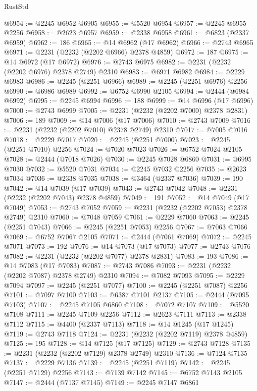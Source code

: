 \begin{lexlean}{RustStd}
\begin{coremodule}
@6954 := @2245 @6952 @6905
@6955 := @5520 @6954
@6957 := @2245 @6955 @2256
@6958 := @2623 @6957
@6959 := @2338 @6958
@6961 := @6823 (@2337 @6959)
@6962 := 186
@6965 := @14 @6962 (@17 @6962)
@6966 := @2743 @6965
@6971 := @2231 (@2232 (@2202 @6966) @2378 @4859)
@6972 := 187
@6975 := @14 @6972 (@17 @6972)
@6976 := @2743 @6975
@6982 := @2231 (@2232 (@2202 @6976) @2378 @2749) @2310
@6983 := @6971 @6982
@6984 := @2229 @6983
@6986 := @2245 (@2251 @6966)
@6989 := @2245 (@2251 @6976) @2256
@6990 := @6986 @6989
@6992 := @6752 @6990 @2105
@6994 := @2444 (@6984 @6992)
@6995 := @2245 @6994
@6996 := 188
@6999 := @14 @6996 (@17 @6996)
@7000 := @2743 @6999
@7005 := @2231 (@2232 (@2202 @7000) @2378 @2831)
@7006 := 189
@7009 := @14 @7006 (@17 @7006)
@7010 := @2743 @7009
@7016 := @2231 (@2232 (@2202 @7010) @2378 @2749) @2310
@7017 := @7005 @7016
@7018 := @2229 @7017
@7020 := @2245 (@2251 @7000)
@7023 := @2245 (@2251 @7010) @2256
@7024 := @7020 @7023
@7026 := @6752 @7024 @2105
@7028 := @2444 (@7018 @7026)
@7030 := @2245 @7028 @6860
@7031 := @6995 @7030
@7032 := @5520 @7031
@7034 := @2245 @7032 @2256
@7035 := @2623 @7034
@7036 := @2338 @7035
@7038 := @3464 (@2337 @7036)
@7039 := 190
@7042 := @14 @7039 (@17 @7039)
@7043 := @2743 @7042
@7048 := @2231 (@2232 (@2202 @7043) @2378 @4859)
@7049 := 191
@7052 := @14 @7049 (@17 @7049)
@7053 := @2743 @7052
@7059 := @2231 (@2232 (@2202 @7053) @2378 @2749) @2310
@7060 := @7048 @7059
@7061 := @2229 @7060
@7063 := @2245 (@2251 @7043)
@7066 := @2245 (@2251 @7053) @2256
@7067 := @7063 @7066
@7069 := @6752 @7067 @2105
@7071 := @2444 (@7061 @7069)
@7072 := @2245 @7071
@7073 := 192
@7076 := @14 @7073 (@17 @7073)
@7077 := @2743 @7076
@7082 := @2231 (@2232 (@2202 @7077) @2378 @2831)
@7083 := 193
@7086 := @14 @7083 (@17 @7083)
@7087 := @2743 @7086
@7093 := @2231 (@2232 (@2202 @7087) @2378 @2749) @2310
@7094 := @7082 @7093
@7095 := @2229 @7094
@7097 := @2245 (@2251 @7077)
@7100 := @2245 (@2251 @7087) @2256
@7101 := @7097 @7100
@7103 := @6387 @7101 @2137
@7105 := @2444 (@7095 @7103)
@7107 := @2245 @7105 @6860
@7108 := @7072 @7107
@7109 := @5520 @7108
@7111 := @2245 @7109 @2256
@7112 := @2623 @7111
@7113 := @2338 @7112
@7115 := @4400 (@2337 @7113)
@7118 := @14 @1245 (@17 @1245)
@7119 := @2743 @7118
@7124 := @2231 (@2232 (@2202 @7119) @2378 @4859)
@7125 := 195
@7128 := @14 @7125 (@17 @7125)
@7129 := @2743 @7128
@7135 := @2231 (@2232 (@2202 @7129) @2378 @2749) @2310
@7136 := @7124 @7135
@7137 := @2229 @7136
@7139 := @2245 (@2251 @7119)
@7142 := @2245 (@2251 @7129) @2256
@7143 := @7139 @7142
@7145 := @6752 @7143 @2105
@7147 := @2444 (@7137 @7145)
@7149 := @2245 @7147 @6861

\end{coremodule}
\end{lexlean}
